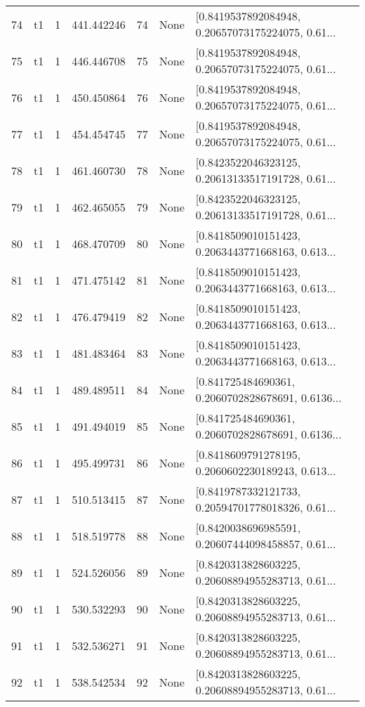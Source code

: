 \begin{tabular}{lllrlll}
74  &  t1 &   1 &  441.442246 &   74 &  None &  [0.8419537892084948, 0.20657073175224075, 0.61... \\
75  &  t1 &   1 &  446.446708 &   75 &  None &  [0.8419537892084948, 0.20657073175224075, 0.61... \\
76  &  t1 &   1 &  450.450864 &   76 &  None &  [0.8419537892084948, 0.20657073175224075, 0.61... \\
77  &  t1 &   1 &  454.454745 &   77 &  None &  [0.8419537892084948, 0.20657073175224075, 0.61... \\
78  &  t1 &   1 &  461.460730 &   78 &  None &  [0.8423522046323125, 0.20613133517191728, 0.61... \\
79  &  t1 &   1 &  462.465055 &   79 &  None &  [0.8423522046323125, 0.20613133517191728, 0.61... \\
80  &  t1 &   1 &  468.470709 &   80 &  None &  [0.8418509010151423, 0.2063443771668163, 0.613... \\
81  &  t1 &   1 &  471.475142 &   81 &  None &  [0.8418509010151423, 0.2063443771668163, 0.613... \\
82  &  t1 &   1 &  476.479419 &   82 &  None &  [0.8418509010151423, 0.2063443771668163, 0.613... \\
83  &  t1 &   1 &  481.483464 &   83 &  None &  [0.8418509010151423, 0.2063443771668163, 0.613... \\
84  &  t1 &   1 &  489.489511 &   84 &  None &  [0.841725484690361, 0.2060702828678691, 0.6136... \\
85  &  t1 &   1 &  491.494019 &   85 &  None &  [0.841725484690361, 0.2060702828678691, 0.6136... \\
86  &  t1 &   1 &  495.499731 &   86 &  None &  [0.8418609791278195, 0.2060602230189243, 0.613... \\
87  &  t1 &   1 &  510.513415 &   87 &  None &  [0.8419787332121733, 0.20594701778018326, 0.61... \\
88  &  t1 &   1 &  518.519778 &   88 &  None &  [0.8420038696985591, 0.20607444098458857, 0.61... \\
89  &  t1 &   1 &  524.526056 &   89 &  None &  [0.8420313828603225, 0.20608894955283713, 0.61... \\
90  &  t1 &   1 &  530.532293 &   90 &  None &  [0.8420313828603225, 0.20608894955283713, 0.61... \\
91  &  t1 &   1 &  532.536271 &   91 &  None &  [0.8420313828603225, 0.20608894955283713, 0.61... \\
92  &  t1 &   1 &  538.542534 &   92 &  None &  [0.8420313828603225, 0.20608894955283713, 0.61... \\

\end{tabular}
